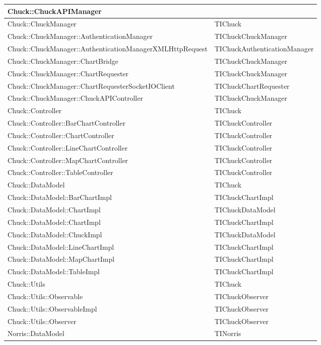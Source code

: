 \begin{longtabu}{| X | X |}
Chuck::ChuckAPIManager	&		\\ \hline
Chuck::ChuckManager	&	TIChuck	\\ \hline
Chuck::ChuckManager::AuthenticationManager	&	TIChuckChuckManager	\\ \hline
Chuck::ChuckManager::AuthenticationManagerXMLHttpRequest	&	TIChuckAuthenticationManager	\\ \hline
Chuck::ChuckManager::ChartBridge	&	TIChuckChuckManager	\\ \hline
Chuck::ChuckManager::ChartRequester	&	TIChuckChuckManager	\\ \hline
Chuck::ChuckManager::ChartRequesterSocketIOClient	&	TIChuckChartRequester	\\ \hline
Chuck::ChuckManager::ChuckAPIController	&	TIChuckChuckManager	\\ \hline
Chuck::Controller	&	TIChuck	\\ \hline
Chuck::Controller::BarChartController	&	TIChuckController	\\ \hline
Chuck::Controller::ChartController	&	TIChuckController	\\ \hline
Chuck::Controller::LineChartController	&	TIChuckController	\\ \hline
Chuck::Controller::MapChartController	&	TIChuckController	\\ \hline
Chuck::Controller::TableController	&	TIChuckController	\\ \hline
Chuck::DataModel	&	TIChuck	\\ \hline
Chuck::DataModel::BarChartImpl	&	TIChuckChartImpl	\\ \hline
Chuck::DataModel::ChartImpl	&	TIChuckDataModel	\\ \hline
Chuck::DataModel::ChartImpl	&	TIChuckChartImpl	\\ \hline
Chuck::DataModel::ChuckImpl	&	TIChuckDataModel	\\ \hline
Chuck::DataModel::LineChartImpl	&	TIChuckChartImpl	\\ \hline
Chuck::DataModel::MapChartImpl	&	TIChuckChartImpl	\\ \hline
Chuck::DataModel::TableImpl	&	TIChuckChartImpl	\\ \hline
Chuck::Utils	&	TIChuck	\\ \hline
Chuck::Utils::Observable	&	TIChuckObserver	\\ \hline
Chuck::Utils::ObservableImpl	&	TIChuckObserver	\\ \hline
Chuck::Utils::Observer	&	TIChuckObserver	\\ \hline
Norris::DataModel	&	TINorris	\\ \hline

\end{longtabu}

